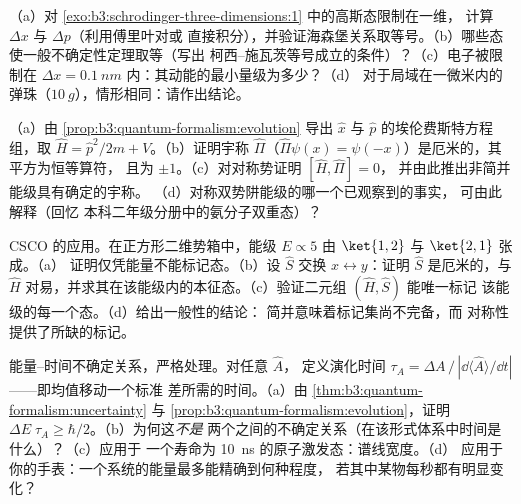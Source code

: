 \begin{exercise}[$\star\star$]\label{exo:b3:quantum-formalism:7}
（a）对
\cref{exo:b3:schrodinger-three-dimensions:1} 中的高斯态限制在一维，
计算 $\Delta x$ 与 $\Delta p$（利用傅里叶对或
直接积分），并验证海森堡关系取等号。（b）哪些态
使一般不确定性定理取等（写出
柯西–施瓦茨等号成立的条件）？（c）电子被限制在
$\Delta x = \qty{0.1}{nm}$ 内：其动能的最小量级为多少？（d）
对于局域在一微米内的弹珠（$\qty{10}{g}$），情形相同：请作出结论。
\end{exercise}

\begin{exercise}[$\star\star$]\label{exo:b3:quantum-formalism:8}
（a）由 \cref{prop:b3:quantum-formalism:evolution} 导出
$\hat x$ 与 $\hat p$ 的埃伦费斯特方程组，取 $\hat H = \hat
p^2/2m + V$。（b）证明宇称 $\hat\Pi$（$\hat\Pi\psi(x) =
\psi(-x)$）是厄米的，其平方为恒等算符，
且为 $\pm1$。（c）对对称势证明 $[\hat H, \hat\Pi] = 0$，
并由此推出非简并能级具有确定的宇称。
（d）对称双势阱能级的哪一个已观察到的事实，
可由此解释（回忆
本科二年级分册中的氨分子双重态）？
\end{exercise}

\begin{exercise}[$\star\star$]\label{exo:b3:quantum-formalism:9}
CSCO 的应用。在正方形二维势箱中，能级 $E
\propto 5$ 由 $\ket{1,2}$ 与 $\ket{2,1}$ 张成。（a）
证明仅凭能量不能标记态。（b）设 $\hat S$ 交换 $x
\leftrightarrow y$：证明 $\hat S$ 是厄米的，与 $\hat
H$ 对易，并求其在该能级内的本征态。（c）验证二元组 $(\hat H, \hat S)$ 能唯一标记
该能级的每一个态。（d）给出一般性的结论：
简并意味着标记集尚不完备，而
对称性提供了所缺的标记。
\end{exercise}

\begin{exercise}[$\star\star\star$]\label{exo:b3:quantum-formalism:10}
能量–时间不确定关系，严格处理。对任意 $\hat A$，
定义演化时间 $\tau_A = \Delta A\,/\,|\dd\langle\hat
A\rangle/\dd t|$——即均值移动一个标准
差所需的时间。（a）由 \cref{thm:b3:quantum-formalism:uncertainty} 与
\cref{prop:b3:quantum-formalism:evolution}，证明 $\Delta
E\;\tau_A \ge \hbar/2$。（b）为何这\emph{不是}
两个之间的不确定关系（在该形式体系中时间是什么）？（c）应用于
一个寿命为 \qty{10}{ns} 的原子激发态：谱线宽度。（d）
应用于你的手表：一个系统的能量最多能精确到何种程度，
若其中某物每秒都有明显变化？
\end{exercise}


